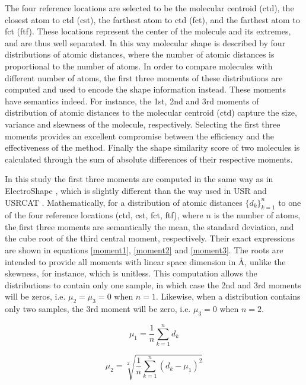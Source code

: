 \documentclass[a4,center,fleqn]{NAR}
\begin{document}
The four reference locations are selected to be the molecular centroid (ctd), the closest atom to ctd (cst), the farthest atom to ctd (fct), and the farthest atom to fct (ftf). These locations represent the center of the molecule and its extremes, and are thus well separated. In this way molecular shape is described by four distributions of atomic distances, where the number of atomic distances is proportional to the number of atoms. In order to compare molecules with different number of atoms, the first three moments of these distributions are computed and used to encode the shape information instead. These moments have semantics indeed. For instance, the 1st, 2nd and 3rd moments of distribution of atomic distances to the molecular centroid (ctd) capture the size, variance and skewness of the molecule, respectively. Selecting the first three moments provides an excellent compromise between the efficiency and the effectiveness of the method. Finally the shape similarity score of two molecules is calculated through the sum of absolute differences of their respective moments.

In this study the first three moments are computed in the same way as in ElectroShape \cite{1337}, which is slightly different than the way used in USR \cite{1379,1332,1380} and USRCAT \cite{1331}. Mathematically, for a distribution of atomic distances $\{d_k\}_{k=1}^n$ to one of the four reference locations (ctd, cst, fct, ftf), where $n$ is the number of atoms, the first three moments are semantically the mean, the standard deviation, and the cube root of the third central moment, respectively. Their exact expressions are shown in equations \eqref{moment1}, \eqref{moment2} and \eqref{moment3}. The roots are intended to provide all moments with linear space dimension in \AA, unlike the skewness, for instance, which is unitless. This computation allows the distributions to contain only one sample, in which case the 2nd and 3rd moments will be zeros, i.e. $\mu_2=\mu_3=0$ when $n=1$. Likewise, when a distribution contains only two samples, the 3rd moment will be zero, i.e. $\mu_3=0$ when $n=2$.

\begin{equation}
\mu_1=\frac{1}{n}\sum_{k=1}^{n}{d_k}
\label{moment1}
\end{equation}

\begin{equation}
\mu_2=\sqrt[2]{\frac{1}{n}\sum_{k=1}^{n}{(d_k-\mu_1)^2}}
\label{moment2}
\end{equation}
\end{document}
